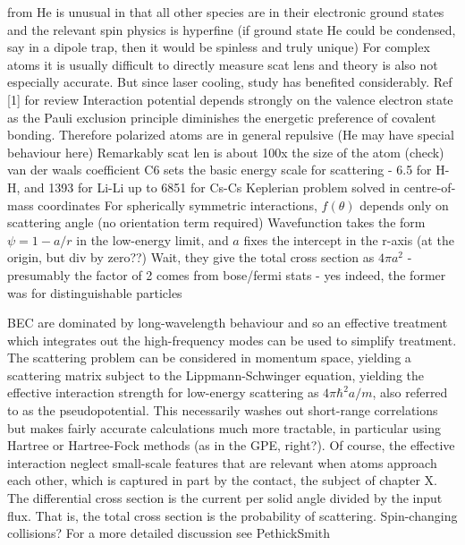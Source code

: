 from \cite{PethickSmith}
	He is unusual in that all other species are in their electronic ground states and the relevant spin physics is hyperfine (if ground state He could be condensed, say in a dipole trap, then it would be spinless and truly unique)
	For complex atoms it is usually difficult to directly measure scat lens and theory is also not especially accurate. 
	But since laser cooling, study has benefited considerably. 
	Ref [1] for review
	Interaction potential depends strongly on the valence electron state as the Pauli exclusion principle diminishes the energetic preference of covalent bonding. Therefore polarized atoms are in general repulsive (He may have special behaviour here)
	Remarkably scat len is about 100x the size of the atom (check)
	van der waals coefficient C6 sets the basic energy scale for scattering - 6.5 for H-H, and 1393 for Li-Li up to 6851 for Cs-Cs
	Keplerian problem solved in centre-of-mass coordinates
	For spherically symmetric interactions, $f(\theta)$ depends only on scattering angle (no orientation term required)
	Wavefunction takes the form $\psi=1-a/r$ in the low-energy limit, and $a$ fixes the intercept in the r-axis (at the origin, but div by zero??)
	Wait, they give the total cross section as $4\pi a^2$ - presumably the factor of 2 comes from bose/fermi stats - yes indeed, the former was for distinguishable particles

	BEC are dominated by long-wavelength behaviour and so an effective treatment which integrates out the high-frequency modes can be used to simplify treatment. The scattering problem can be considered in momentum space, yielding a scattering matrix subject to the Lippmann-Schwinger equation, yielding the effective interaction strength for low-energy scattering as $4\pi \hbar^2 a/m$, also referred to as the pseudopotential. This necessarily washes out short-range correlations but makes fairly accurate calculations much more tractable, in particular using Hartree or Hartree-Fock methods (as in the GPE, right?). 
	Of course, the effective interaction neglect small-scale features that are relevant when atoms approach each other, which is captured in part by the contact, the subject of chapter X.
	The differential cross section is the current per solid angle divided by the input flux. That is, the total cross section is the probability of scattering. 
	Spin-changing collisions? 
	For a more detailed discussion see PethickSmith


